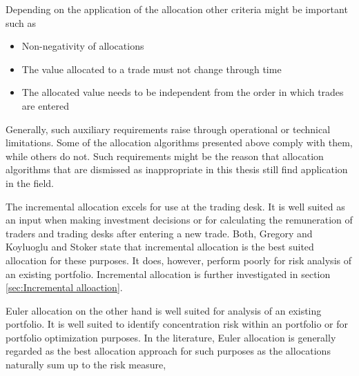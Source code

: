 \documentclass[../Thesis_AHoecherl.tex]{subfiles}
\begin{document}
Depending on the application of the allocation other criteria might be important such as
\begin{itemize}
    \item Non-negativity of allocations
    \item The value allocated to a trade must not change through time
    \item The allocated value needs to be independent from the order in which trades are entered 
\end{itemize}
Generally, such auxiliary requirements raise through operational or technical limitations. Some of the allocation algorithms presented above comply with them, while others do not. 
Such requirements might be the reason that allocation algorithms that are dismissed as inappropriate in this thesis still find application in the field.

The incremental allocation excels for use at the trading desk. It is well suited as an input when making investment decisions or for calculating the remuneration of traders and trading desks after entering a new trade.
Both, Gregory \cite{gregory2015xva} and Koyluoglu and Stoker \cite{koyluoglu2002risk} state that incremental allocation is the best suited allocation for these purposes. It does, however, perform poorly for risk analysis of an existing portfolio. Incremental allocation is further investigated in section \ref{sec:Incremental alloaction}.

Euler allocation on the other hand is well suited for analysis of an existing portfolio. It is well suited to identify concentration risk within an portfolio or for portfolio optimization purposes. In the literature, Euler allocation is generally regarded as the best allocation approach for such purposes as the allocations naturally sum up to the risk measure, 



\end{document}
